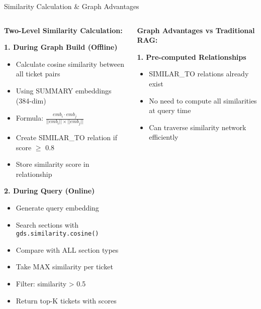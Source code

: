 \documentclass[10pt, aspectratio=169]{beamer}
\begin{document}
\begin{frame}{Similarity Calculation \& Graph Advantages}
    \begin{columns}[T]
        \begin{column}{0.5\textwidth}
            \textbf{Two-Level Similarity Calculation:}
            
            \textbf{1. During Graph Build (Offline)}
            \begin{itemize}
                \scriptsize
                \item Calculate cosine similarity between all ticket pairs
                \item Using SUMMARY embeddings (384-dim)
                \item Formula: $\frac{emb_i \cdot emb_j}{||emb_i|| \times ||emb_j||}$
                \item Create SIMILAR\_TO relation if score $\geq$ 0.8
                \item Store similarity score in relationship
            \end{itemize}
            
            \textbf{2. During Query (Online)}
            \begin{itemize}
                \scriptsize
                \item Generate query embedding
                \item Search sections with \texttt{gds.similarity.cosine()}
                \item Compare with ALL section types
                \item Take MAX similarity per ticket
                \item Filter: similarity > 0.5
                \item Return top-K tickets with scores
            \end{itemize}
        \end{column}
        
        \begin{column}{0.5\textwidth}
            \textbf{Graph Advantages vs Traditional RAG:}
            
            \textbf{1. Pre-computed Relationships}
            \begin{itemize}
                \scriptsize
                \item SIMILAR\_TO relations already exist
                \item No need to compute all similarities at query time
                \item Can traverse similarity network efficiently
            \end{itemize}
            

\end{column}
\end{columns}
\end{frame}
\end{document}
